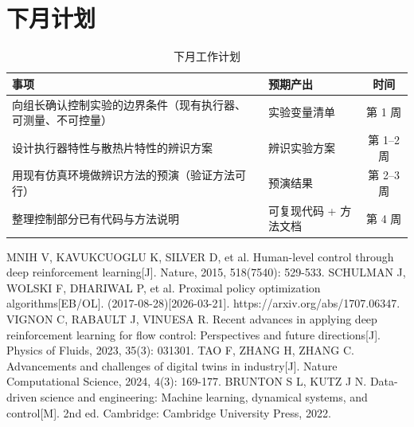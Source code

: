 \documentclass[stage1]{ydzjreport}
\begin{document}
\section{下月计划}

\begin{table}[htbp]
\centering
\caption{下月工作计划}
\begin{tabularx}{\textwidth}{@{}Y Y c@{}}
\toprule
{} 事项 & 预期产出 & 时间 \\
\midrule
向组长确认控制实验的边界条件（现有执行器、可测量、不可控量） & 实验变量清单 & 第 1 周 \\
设计执行器特性与散热片特性的辨识方案 & 辨识实验方案 & 第 1--2 周 \\
用现有仿真环境做辨识方法的预演（验证方法可行） & 预演结果 & 第 2--3 周 \\
整理控制部分已有代码与方法说明 & 可复现代码 + 方法文档 & 第 4 周 \\
\bottomrule
\end{tabularx}
\end{table}

\begin{thebibliography}{9}
 MNIH V, KAVUKCUOGLU K, SILVER D, et al. Human-level control through deep reinforcement learning[J]. Nature, 2015, 518(7540): 529-533.
 SCHULMAN J, WOLSKI F, DHARIWAL P, et al. Proximal policy optimization algorithms[EB/OL]. (2017-08-28)[2026-03-21]. https://arxiv.org/abs/1707.06347.
 VIGNON C, RABAULT J, VINUESA R. Recent advances in applying deep reinforcement learning for flow control: Perspectives and future directions[J]. Physics of Fluids, 2023, 35(3): 031301.
 TAO F, ZHANG H, ZHANG C. Advancements and challenges of digital twins in industry[J]. Nature Computational Science, 2024, 4(3): 169-177.
 BRUNTON S L, KUTZ J N. Data-driven science and engineering: Machine learning, dynamical systems, and control[M]. 2nd ed. Cambridge: Cambridge University Press, 2022.
\end{thebibliography}
\end{document}
